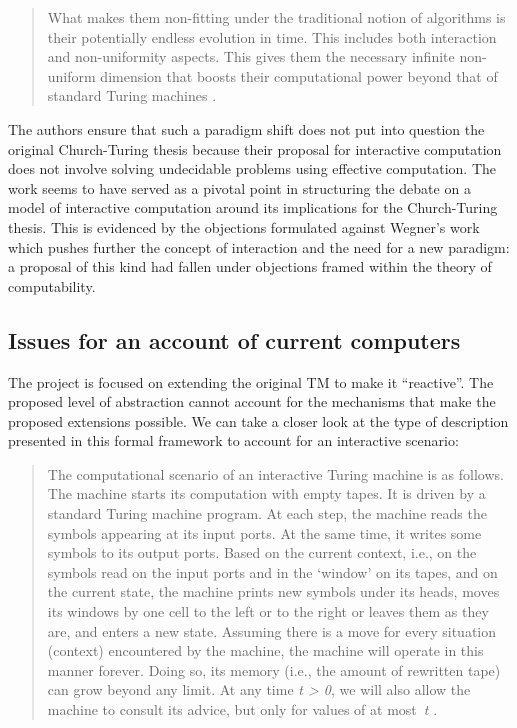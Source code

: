 \documentclass[a4paper, 11pt, twoside]{article}
\begin{document}
\begin{quote}
What makes them non-fitting under the traditional notion of algorithms is their potentially endless evolution in time. This includes both interaction and non-uniformity aspects. This gives them the necessary infinite non-uniform dimension that boosts their computational power beyond that of standard Turing machines \parencite{VanLeeuwen2001}.
\end{quote}

The authors ensure that such a paradigm shift does not put into question the original Church-Turing thesis because their proposal for interactive computation does not involve solving undecidable problems \parencite{VanLeeuwen2001} using effective computation. 
The work seems to have served as a pivotal point in structuring the debate on a model of interactive computation around its implications for the Church-Turing thesis. This is evidenced by the objections formulated against Wegner's work which pushes further the concept of interaction and the need for a new paradigm: a proposal of this kind had fallen under objections framed within the theory of computability.

\subsection{Issues for an account of current computers}

The project is focused on extending the original TM to make it ``reactive''. The proposed level of abstraction cannot account for the mechanisms that make the proposed extensions possible. We can take a closer look at the type of description presented in this formal framework to account for an interactive scenario: 

\begin{quote}
The computational scenario of an interactive Turing machine is as follows. The machine starts its computation with empty tapes. It is driven by a standard Turing machine program. At each step, the machine reads the symbols appearing at its input ports. At the same time, it writes some symbols to its output ports. Based on the current context, i.e., on the symbols read on the input ports and in the ‘window’ on its tapes, and on the current state, the machine prints new symbols under its heads, moves its windows by one cell to the left or to the right or leaves them as they are, and enters a new state. Assuming there is a move for every situation (context) encountered by the machine, the machine will operate in this manner forever. Doing so, its memory (i.e., the amount of rewritten tape) can grow beyond any limit. At any time \textit{t > 0}, we will also allow the machine to consult its advice, but only for values of at most~\textit{t} \parencite{VanLeeuwen2001}.
\end{quote}
\end{document}
